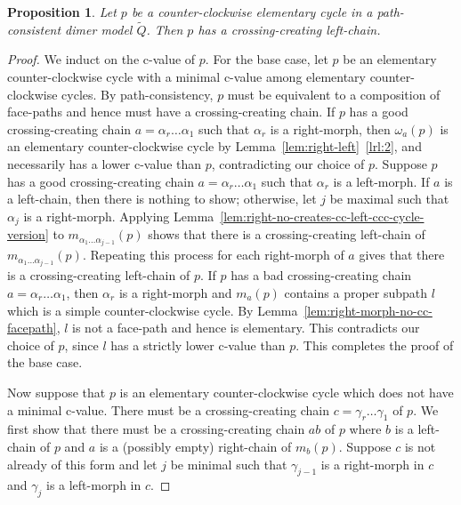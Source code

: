 \documentclass{article}
\newtheorem{prop}[thm]{Proposition}
\theoremstyle{definition}
\begin{document}
\begin{prop}\label{prop:simple-cc-cycle-c-left-chain}
	Let $p$ be a counter-clockwise elementary cycle in a path-consistent dimer model $\widetilde Q$. Then $p$ has a crossing-creating left-chain.
\end{prop}
\begin{proof}
	We induct on the c-value of $p$. 
	For the base case, let $p$ be an elementary counter-clockwise cycle with a minimal c-value among elementary counter-clockwise cycles.
	By path-consistency, $p$ must be equivalent to a composition of face-paths and hence must have a crossing-creating chain. If $p$ has a good crossing-creating chain $a=\alpha_r\dots\alpha_1$ such that $\alpha_r$ is a right-morph, then $\omega_a(p)$ is an elementary counter-clockwise cycle by Lemma~\ref{lem:right-left}~\eqref{lrl:2}, and necessarily has a lower c-value than $p$, contradicting our choice of $p$.
	Suppose $p$ has a good crossing-creating chain $a=\alpha_r\dots\alpha_1$ such that $\alpha_r$ is a left-morph. If $a$ is a left-chain, then there is nothing to show; otherwise, let $j$ be maximal such that $\alpha_j$ is a right-morph. Applying Lemma~\ref{lem:right-no-creates-cc-left-ccc-cycle-version} to $m_{\alpha_1\dots\alpha_{j-1}}(p)$ shows that there is a crossing-creating left-chain of $m_{\alpha_1\dots\alpha_{j-1}}(p)$. Repeating this process for each right-morph of $a$ gives that there is a crossing-creating left-chain of $p$.
	If $p$ has a bad crossing-creating chain $a=\alpha_r\dots\alpha_1$, then $\alpha_r$ is a right-morph and $m_a(p)$ contains a proper subpath $l$ which is a simple counter-clockwise cycle. By Lemma~\ref{lem:right-morph-no-cc-facepath}, $l$ is not a face-path and hence is elementary. This contradicts our choice of $p$, since $l$ has a strictly lower c-value than $p$. This completes the proof of the base case.


	Now suppose that $p$ is an elementary counter-clockwise cycle which does not have a minimal c-value.
	There must be a crossing-creating chain $c=\gamma_r\dots\gamma_1$ of $p$. We first show that there must be a crossing-creating chain $ab$ of $p$ where $b$ is a left-chain of $p$ and $a$ is a (possibly empty) right-chain of $m_b(p)$. Suppose $c$ is not already of this form and let $j$ be minimal such that $\gamma_{j-1}$ is a right-morph in $c$ and $\gamma_j$ is a left-morph in $c$. 


\end{proof}
\end{document}
